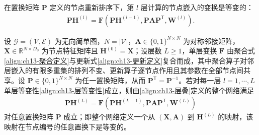\documentclass[../../main.tex]{subfiles}
\begin{document}
在置换矩阵 $\bm{P}$ 定义的节点重新排序下，第 $l$ 层计算的节点嵌入的变换是等变的：
\begin{align}
\bm{P}\bm{H}^{(l)}=\bm{F}\!\left(\bm{P}\bm{H}^{(l-1)},\bm{P}\bm{A}\bm{P}^{\mathsf T},\bm{W}^{(l)}\right).
\label{align:ch13-层等变性}
\end{align}

\begin{theorem}[图神经网络的置换等变性]\label{theorem:ch13-图网络等变性}
设 $\mathcal{G}=(\mathcal{V},\mathcal{E})$ 为无向简单图，$N=|\mathcal{V}|$，$\bm{A}\in\{0,1\}^{N\times N}$ 为对称邻接矩阵，$\bm{X}\in\mathbb{R}^{N\times D_0}$ 为节点特征矩阵且 $\bm{H}^{(0)}=\bm{X}$；设层数 $L\geqslant1$，单层变换 $\bm{F}$ 由聚合式\eqref{align:ch13-聚合定义}与更新式\eqref{align:ch13-更新定义}复合而成，其中聚合算子对邻居嵌入的有限多重集的排列不变、更新算子逐节点作用且其参数在全部节点间共享。设 $\bm{P}\in\{0,1\}^{N\times N}$ 为任一置换矩阵，从而 $\bm{P}^{\mathsf T}=\bm{P}^{-1}$。若对每一层 $l=1,\cdots,L$ 单层等变性\eqref{align:ch13-层等变性}成立，则由\eqref{align:ch13-层叠}定义的整个网络满足
\begin{align*}
\bm{P}\bm{H}^{(L)}=\bm{F}\!\left(\bm{P}\bm{H}^{(L-1)},\bm{P}\bm{A}\bm{P}^{\mathsf T},\bm{W}^{(L)}\right)
\end{align*}
对任意置换矩阵 $\bm{P}$ 成立；即整个网络定义一个从 $(\bm{X},\bm{A})$ 到 $\bm{H}^{(L)}$ 的映射，该映射在节点编号的任意置换下是等变的。
\end{theorem}
\end{document}
